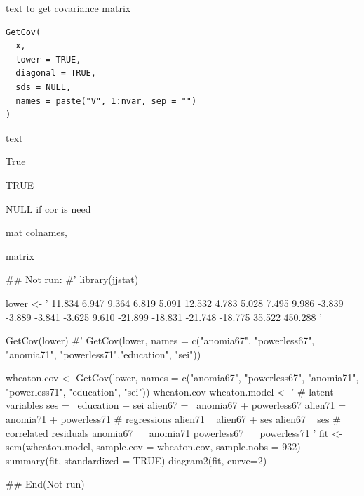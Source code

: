 \documentclass[a4paper]{book}
\begin{document}
%
\begin{Description}
text to get covariance matrix
\end{Description}
%
\begin{Usage}
\begin{verbatim}
GetCov(
  x,
  lower = TRUE,
  diagonal = TRUE,
  sds = NULL,
  names = paste("V", 1:nvar, sep = "")
)
\end{verbatim}
\end{Usage}
%
\begin{Arguments}
\begin{ldescription}
\item[\code{x}] text

\item[\code{lower}] True

\item[\code{diagonal}] TRUE

\item[\code{sds}] NULL if cor is need

\item[\code{names}] mat colnames,
\end{ldescription}
\end{Arguments}
%
\begin{Value}
matrix
\end{Value}
%
\begin{Examples}
\begin{ExampleCode}

\#\# Not run: 
#'
library(jjstat)

lower <- '
 11.834
  6.947   9.364
  6.819   5.091  12.532
  4.783   5.028   7.495   9.986
 -3.839  -3.889  -3.841  -3.625  9.610
-21.899 -18.831 -21.748 -18.775 35.522 450.288 '

GetCov(lower)
#' GetCov(lower, names = c("anomia67", "powerless67", "anomia71", "powerless71","education", "sei"))

wheaton.cov <-
  GetCov(lower, names = c("anomia67", "powerless67",
                          "anomia71", "powerless71",
                          "education", "sei"))
wheaton.cov
wheaton.model <- '
  # latent variables
    ses     =~ education + sei
    alien67 =~ anomia67 + powerless67
    alien71 =~ anomia71 + powerless71
  # regressions
    alien71 ~ alien67 + ses
    alien67 ~ ses
  # correlated residuals
    anomia67 ~~ anomia71
    powerless67 ~~ powerless71
'
fit <- sem(wheaton.model,
           sample.cov = wheaton.cov,
           sample.nobs = 932)
summary(fit, standardized = TRUE)
diagram2(fit, curve=2)

## End(Not run)


\end{ExampleCode}
\end{Examples}
\end{document}
